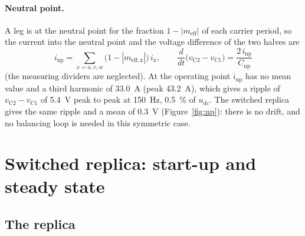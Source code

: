 \documentclass[11pt,a4paper]{scrartcl}
\newcommand{\ped}[1]{_{\mathrm{#1}}}
\begin{document}
\begin{onehalfspace}
\paragraph{Neutral point.} A leg is at the neutral point for the fraction $1 - |m\ped{eff}|$ of each carrier period, so the current into the neutral point and the voltage difference of the two halves are
\begin{equation}
	i\ped{np} = \sum_{x = u,v,w} \big(1 - |m\ped{eff,x}|\big)\, i\ped{x}, \qquad \frac{d}{dt}\big(v\ped{C2} - v\ped{C1}\big) = \frac{2\, i\ped{np}}{C\ped{np}}
	\label{eq:np}
\end{equation}
(the measuring dividers are neglected). At the operating point $i\ped{np}$ has no mean value and a third harmonic of \SI{33.0}{\ampere} (peak \SI{43.2}{\ampere}), which gives a ripple of $v\ped{C2} - v\ped{C1}$ of \SI{5.4}{\volt} peak to peak at \SI{150}{\hertz}, \num{0.5}~\% of $u\ped{dc}$. The switched replica gives the same ripple and a mean of \SI{+0.3}{\volt} (Figure~\ref{fig:np}): there is no drift, and no balancing loop is needed in this symmetric case.

\section{Switched replica: start-up and steady state}
\label{sec:switched}

\subsection{The replica}
\label{sec:replica}


\end{onehalfspace}
\end{document}
